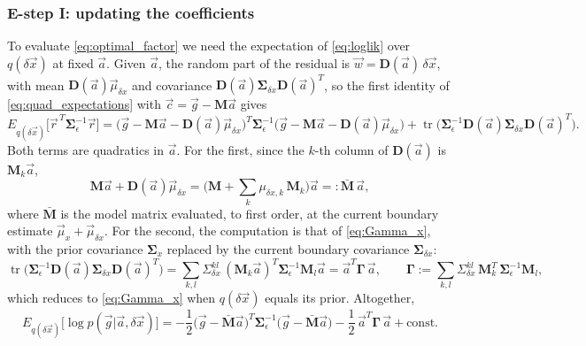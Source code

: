 \documentclass{article}
\begin{document}
\subsubsection*{E-step I: updating the coefficients} \label{sec:estep_a}
To evaluate \eqref{eq:optimal_factor} we need the expectation of \eqref{eq:loglik} over $q(\delta\vec x)$ at fixed $\vec a$. Given $\vec a$, the random part of the residual is $\vec w = \mathbf D(\vec a)\,\delta\vec x$, with mean $\mathbf D(\vec a)\vec\mu_{\delta x}$ and covariance $\mathbf D(\vec a)\mathbf{\Sigma}_{\delta x}\mathbf D(\vec a)^T$, so the first identity of \eqref{eq:quad_expectations} with $\vec c = \vec g - \mathbf M\vec a$ gives
\begin{equation}
    E_{q(\delta\vec x)}\big[\vec r^{\,T}\mathbf{\Sigma}_\epsilon^{-1}\vec r\big] = \big(\vec g - \mathbf M\vec a - \mathbf D(\vec a)\vec\mu_{\delta x}\big)^T\mathbf{\Sigma}_\epsilon^{-1}\big(\vec g - \mathbf M\vec a - \mathbf D(\vec a)\vec\mu_{\delta x}\big) + \operatorname{tr}\big(\mathbf{\Sigma}_\epsilon^{-1}\mathbf D(\vec a)\mathbf{\Sigma}_{\delta x}\mathbf D(\vec a)^T\big).
\end{equation}
Both terms are quadratics in $\vec a$. For the first, since the $k$-th column of $\mathbf D(\vec a)$ is $\mathbf M_k \vec a$,
\begin{equation}
    \mathbf M \vec a + \mathbf D(\vec a)\vec\mu_{\delta x} = \Big(\mathbf M + \sum_k \mu_{\delta x, k}\,\mathbf M_k\Big)\vec a =: \bar{\mathbf M}\,\vec a, \label{eq:Mbar}
\end{equation}
where $\bar{\mathbf M}$ is the model matrix evaluated, to first order, at the current boundary estimate $\vec\mu_x + \vec\mu_{\delta x}$. For the second, the computation is that of \eqref{eq:Gamma_x}, with the prior covariance $\mathbf{\Sigma}_x$ replaced by the current boundary covariance $\mathbf{\Sigma}_{\delta x}$:
\begin{equation}
    \operatorname{tr}\big(\mathbf{\Sigma}_\epsilon^{-1}\mathbf D(\vec a)\mathbf{\Sigma}_{\delta x}\mathbf D(\vec a)^T\big)
    = \sum_{k,l} \Sigma_{\delta x}^{kl}\, (\mathbf M_k\vec a)^T\mathbf{\Sigma}_\epsilon^{-1}\mathbf M_l\vec a
    = \vec a^T \mathbf\Gamma\, \vec a, \qquad
    \mathbf\Gamma := \sum_{k,l} \Sigma_{\delta x}^{kl}\, \mathbf M_k^T\,\mathbf{\Sigma}_\epsilon^{-1}\mathbf M_l, \label{eq:Gamma}
\end{equation}
which reduces to \eqref{eq:Gamma_x} when $q(\delta\vec x)$ equals its prior.
Altogether,
\begin{equation}
    E_{q(\delta\vec x)}\big[\log p(\vec g|\vec a, \delta\vec x)\big] = -\frac12 \big(\vec g - \bar{\mathbf M}\vec a\big)^T\mathbf{\Sigma}_\epsilon^{-1}\big(\vec g - \bar{\mathbf M}\vec a\big) - \frac12\, \vec a^T \mathbf\Gamma\, \vec a + \text{const}. \label{eq:expected_loglik_a}
\end{equation}
\end{document}
